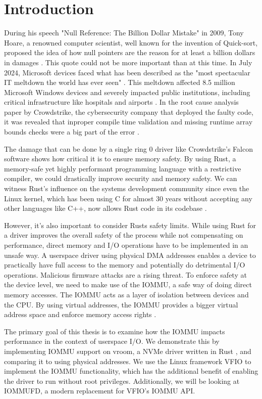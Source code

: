 \chapter{Introduction}\label{c:introduction}

During his speech "Null Reference: The Billion Dollar Mistake" in 2009, Tony Hoare, a renowned computer scientist, well known for the invention of Quick-sort, proposed the idea of how null pointers are the reason for at least a billion dollars in damages \cite{billiondollarmistake}. This quote could not be more important than at this time. In July 2024, Microsoft devices faced what has been described as the "most spectacular IT meltdown the world has ever seen" \cite{bloombergmeltdown}. This meltdown affected 8.5 million Microsoft Windows devices and severely impacted public institutions, including critical infrastructure like hospitals and airports \cite{bloomberg8milliondevices}. In the root cause analysis paper by Crowdstrike, the cybersecurity company that deployed the faulty code, it was revealed that inproper compile time validation and missing runtime array bounds checks were a big part of the error \cite{crowdstrikerca}.

The damage that can be done by a single ring 0 driver like Crowdstrike's Falcon software shows how critical it is to ensure memory safety. By using Rust, a memory-safe yet highly performant programming language with a restrictive compiler, we could drastically improve security and memory safety. We can witness Rust's influence on the systems development community since even the Linux kernel, which has been using C for almost 30 years without accepting any other languages like C++, now allows Rust code in its codebase \cite{linuxrustpull}.

However, it's also important to consider Rusts safety limits. While using Rust for a driver improves the overall safety of the process while not compensating on performance, direct memory and I/O operations have to be implemented in an unsafe way. A userspace driver using physical DMA addresses enables a device to practically have full access to the memory and potentially do detrimental I/O operations. Malicious firmware attacks are a rising threat.
To enforce safety at the device level, we need to make use of the IOMMU, a safe way of doing direct memory accesses. The IOMMU acts as a layer of isolation between devices and the CPU. By using virtual addresses, the IOMMU provides a bigger virtual address space and enforce memory access rights \cite{OLS2007}.

The primary goal of this thesis is to examine how the IOMMU impacts performance in the context of userspace I/O.
We demonstrate this by implementing IOMMU support on vroom, a NVMe driver written in Rust \cite{vroom}, and comparing it to using physical addresses. We use the Linux framework VFIO to implement the IOMMU functionality, which has the additional benefit of enabling the driver to run without root privileges. Additionally, we will be looking at IOMMUFD, a modern replacement for VFIO's IOMMU API.

